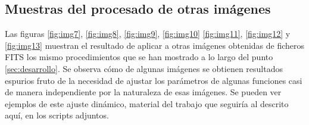 \documentclass[a4paper,12pt]{article}
\begin{document}
\subsection{Muestras del procesado de otras imágenes}
Las figuras \ref{fig:img7}, \ref{fig:img8}, \ref{fig:img9}, \ref{fig:img10} \ref{fig:img11}, \ref{fig:img12} y \ref{fig:img13} muestran el resultado de aplicar a otras imágenes obtenidas de ficheros FITS los mismo procedimientos que se han mostrado a lo largo del punto \ref{sec:desarrollo}. Se observa cómo de algunas imágenes se obtienen resultados espurios fruto de la necesidad de ajustar los parámetros de algunas funciones casi de manera independiente por la naturaleza de esas imágenes. Se pueden ver ejemplos de este ajuste dinámico, material del trabajo que seguiría al descrito aquí, en los scripts adjuntos.
\begin{figure}[htbp!]
\centering
{}\\
\hspace{0.5cm}

\end{figure}
\end{document}
